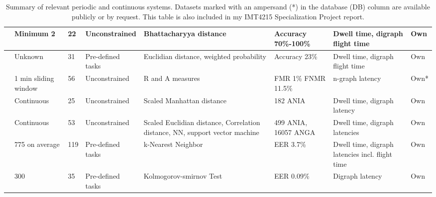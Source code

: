 \documentclass[informationsecurity]{gucmasterproject}
\begin{document}
\begin{table}[h]
{\begin{tabular}{ |l|p{2.1cm}|l|p{2.15cm}|p{3cm}|p{2.3cm}|p{2.5cm}|l| }
 \cite{Janakiraman2007} & Minimum 2 & 22 & Unconstrained & Bhattacharyya distance & Accuracy 70\%-100\% & Dwell time, digraph flight time & Own\\ \hline
 \cite{Monrose} & Unknown & 31 & Pre-defined tasks & Euclidian distance, weighted probability & Accuracy 23\% & Dwell time, digraph flight time & Own\\ \hline
 \cite{sliding} & 1 min sliding window & 56 & Unconstrained & R and A measures & FMR 1\% FNMR 11.5\% & n-graph latency & Own*\\ \hline
 \cite{BOURS201236} & Continuous & 25 & Unconstrained & Scaled Manhattan distance & 182 ANIA & Dwell time, digraph latency & Own\\ \hline
 \cite{mondal} & Continuous & 53 & Unconstrained & Scaled Euclidian distance, Correlation distance, NN, support vector machine & 499 ANIA, 16057 ANGA & Dwell time, digraph latencies & Own \\ \hline
 \cite{monaco} & 775 on average & 119 & Pre-defined tasks & k-Nearest Neighbor & EER 3.7\% & Dwell time, digraph latencies incl. flight time & Own \\ \hline
 \cite{park} & 300 & 35 & Pre-defined tasks & Kolmogorov-smirnov Test & EER 0.09\% & Digraph latency & Own \\ \hline

\end{tabular}
}
\caption{Summary of relevant periodic and continuous systems. Datasets marked with an ampersand (*) in the database (DB) column are available publicly or by request. This table is also included in my IMT4215 Specialization Project report.}
\label{tab:summary}
\end{table}



\end{document}
